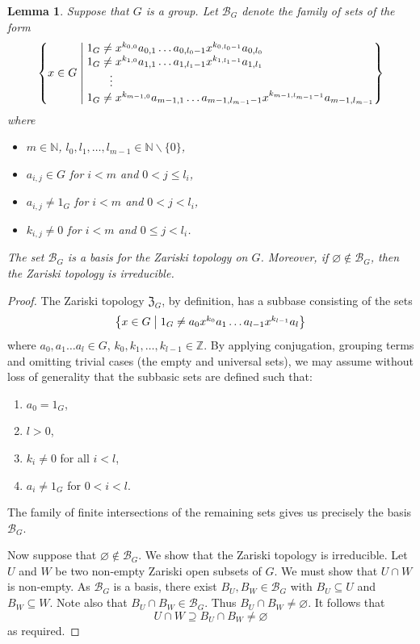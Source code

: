 \documentclass[11pt]{amsart}
\makeatletter
\newtheorem{lemma}[theorem]{Lemma}
\newcommand{\N}{\mathbb N}
\newcommand{\Z}{\mathbb Z}
\newcommand{\makeset}[2]{\left\lbrace #1 \;\middle|\;
 \begin{tabular}{@{}l@{}}
   #2
  \end{tabular}
  \right\rbrace}
\makeatother
\begin{document}
\begin{lemma}\label{lem:techZariski}
    Suppose that \(G\) is a group.
    Let \(\mathcal{B}_G\) denote the family of sets of the form
    \begin{equation}\label{bigeq}
       \makeset{x\in G}{\(1_G\neq x^{k_{0,0}}a_{0,1}\ldots a_{0,l_0-1}x^{k_{0,l_0-1}}a_{0,l_0}\)\\
   \(1_G\neq x^{k_{1,0}}a_{1,1}\ldots a_{1,l_1-1}x^{k_{1,l_1-1}}a_{1,l_1}\)\\
   \quad\quad\vdots\\
   \(1_G\neq x^{k_{m-1,0}}a_{m-1,1}\ldots a_{m-1,l_{m-1}-1}x^{k_{m-1,l_{m-1}-1}}a_{m-1,l_{m-1}}\)}
    \end{equation}
    where  
    \begin{itemize}
    \item \(m\in \N\), \(l_0,l_1,\ldots, l_{m-1}\in \N\backslash \{0\}\),
        \item  \(a_{i,j}\in G\) for \(i<m\) and \(0<j\leq l_i\),
        \item  \(a_{i,j}\neq 1_G\) for \(i<m\) and \(0<j<l_i\),
        \item  \(k_{i,j}\neq 0\) for \(i<m\) and \(0\leq j<l_i\).
    \end{itemize}
    The set \(\mathcal{B}_G\) is a basis for the Zariski topology on \(G\).
    Moreover, if \(\varnothing\notin \mathcal{B}_G\), then the Zariski topology is irreducible.
\end{lemma}
\begin{proof}
  The Zariski topology \(\mathfrak{Z}_G\), by definition, has a subbase consisting of the sets
    \[\makeset{x\in G}{\(1_G\neq a_{0}x^{k_0}a_1\ldots a_{l-1}x^{k_{l-1}}a_l\)}\]
    where  \(a_0,a_1\ldots a_{l}\in G\), \(k_{0},k_{1},\ldots, k_{l-1}\in \Z \). 
    By applying conjugation, grouping terms and omitting trivial cases (the empty and universal sets), we may assume without loss of generality that the subbasic sets are defined such that:
    \begin{enumerate}
        \item  \(a_0=1_G\),
        \item  \(l>0\),
        \item \(k_i\neq 0\) for all \(i<l\),
        \item \(a_i\neq 1_G\) for \(0<i< l\).
    \end{enumerate}
    The family of finite intersections of the remaining sets gives us precisely the basis \(\mathcal{B}_G\).
    
    Now suppose that \(\varnothing\notin \mathcal{B}_G\). We show that the Zariski topology is irreducible. Let \(U\) and \(W\) be two non-empty Zariski open subsets of \(G\). We must show that \(U\cap W\) is non-empty.
    As \(\mathcal{B}_G\) is a basis, there exist \(B_U, B_W\in \mathcal{B}_G\) with \(B_U\subseteq U\) and \(B_W\subseteq W\).
    Note also that \(B_U\cap B_W\in \mathcal{B}_G\). Thus \(B_U\cap B_W\neq \varnothing\).
    It follows that
    \[U\cap W \supseteq B_U\cap B_W \neq\varnothing\]
    as required.
    
\end{proof}
\end{document}
